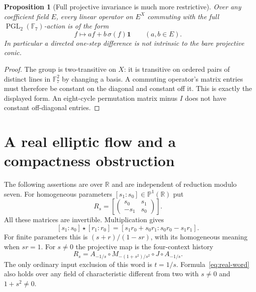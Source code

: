 \documentclass[11pt]{article}
\newtheorem{proposition}[theorem]{Proposition}
\theoremstyle{definition}
\theoremstyle{remark}
\newcommand{\F}{\mathbb F}
\newcommand{\R}{\mathbb R}
\newcommand{\PP}{\mathbb P}
\newcommand{\PGL}{\operatorname{PGL}}
\begin{document}
\begin{proposition}[Full projective invariance is much more restrictive]
\label{prop:commutant}
Over any coefficient field $E$, every linear operator on $E^X$ commuting
with the full $\PGL_2(\F_7)$-action is of the form
\[
 f\longmapsto a f+b\,\sigma(f)\mathbf1\qquad(a,b\in E).
\]
In particular a directed one-step difference is not intrinsic to the bare
projective conic.
\end{proposition}
\begin{proof}
The group is two-transitive on $X$: it is transitive on ordered pairs of
distinct lines in $\F_7^2$ by changing a basis. A commuting operator's matrix
entries must therefore be constant on the diagonal and constant off it.
This is exactly the displayed form. An eight-cycle permutation matrix
minus $I$ does not have constant off-diagonal entries.
\end{proof}

\section{A real elliptic flow and a compactness obstruction}
The following assertions are over $\R$ and are independent of reduction
modulo seven. For homogeneous parameters $[s_1:s_0]\in\PP^1(\R)$ put
\[
 R_s=\left[\begin{pmatrix}s_0&s_1\\-s_1&s_0\end{pmatrix}\right].
\]
All these matrices are invertible. Multiplication gives
\begin{equation}\label{eq:real-law}
 [s_1:s_0]\star[r_1:r_0]
  =[s_1r_0+s_0r_1:s_0r_0-s_1r_1].
\end{equation}
For finite parameters this is $(s+r)/(1-sr)$, with its homogeneous meaning
when $sr=1$. For $s\ne0$ the projective map is the four-context history
\begin{equation}\label{eq:real-word}
 R_s=A_{-1/s}\circ M_{-(1+s^2)/s^2}\circ J\circ A_{-1/s}.
\end{equation}
The only ordinary input exclusion of this word is $t=1/s$.
Formula~\eqref{eq:real-word} also holds over any field of characteristic
different from two with $s\ne0$ and $1+s^2\ne0$.
\end{document}
